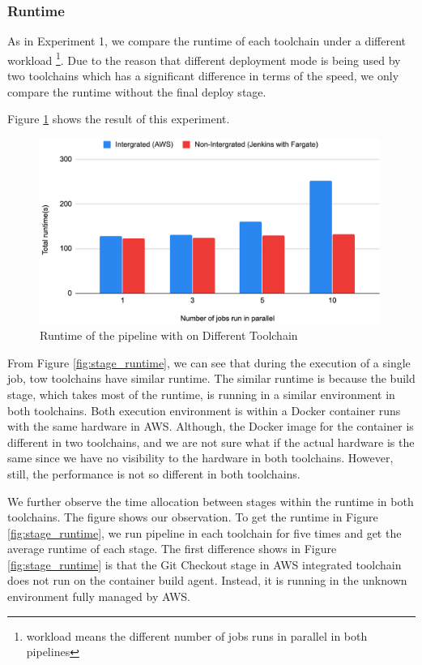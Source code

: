 \subsubsection{Runtime}
As in Experiment 1, we compare the runtime of each toolchain under a different workload \footnote{ workload means the different number of jobs runs in parallel in both pipelines}. Due to the reason that different deployment mode is being used by two toolchains which has a significant difference in terms of the speed, we only compare the runtime without the final deploy stage. 
\par
Figure \ref{fig:compareaws} shows the result of this experiment. 
\begin{figure}[h]
    \centering
    \includegraphics[width=0.99\textwidth]{pics/compare-aws.png}
    \caption{Runtime of the pipeline with on Different Toolchain}
    \label{fig:compareaws}
    \end{figure}
From Figure \ref{fig:stage_runtime}, we can see that during the execution of a single job, tow toolchains have similar runtime. The similar runtime is because the build stage, which takes most of the runtime, is running in a similar environment in both toolchains. Both execution environment is within a Docker container runs with the same hardware in AWS. Although, the Docker image for the container is different in two toolchains, and we are not sure what if the actual hardware is the same since we have no visibility to the hardware in both toolchains. However, still, the performance is not so different in both toolchains.
\par
We further observe the time allocation between stages within the runtime in both toolchains. The figure shows our observation. To get the runtime in Figure \ref{fig:stage_runtime}, we run pipeline in each toolchain for five times and get the average runtime of each stage. The first difference shows in Figure \ref{fig:stage_runtime} is that the Git Checkout stage in AWS integrated toolchain does not run on the container build agent. Instead, it is running in the unknown environment fully managed by AWS.
